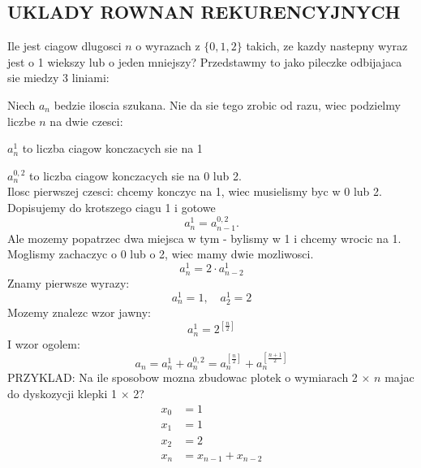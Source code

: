 \documentclass{article}
\begin{document}
\subsection*{UKLADY ROWNAN REKURENCYJNYCH}
    Ile jest ciagow dlugosci $n$ o wyrazach z $\{0,1,2\}$ takich, ze kazdy nastepny wyraz jest o 1 wiekszy lub o jeden mniejszy?
    Przedstawmy to jako \color{acc}pileczke odbijajaca sie miedzy 3 liniami\color{txt}:
    \begin{center}\end{center}
    Niech $a_n$ bedzie iloscia szukana. \color{acc}Nie da sie tego zrobic od razu, wiec podzielmy liczbe $n$ na dwie czesci\color{txt}:\smallskip\par
        $a_n^1$ to liczba ciagow konczacych sie na 1\par
        $a_n^{0,2}$ to liczba ciagow konczacych sie na 0 lub 2.\medskip\\
    Ilosc pierwszej czesci: chcemy konczyc na 1, wiec musielismy byc w 0 lub 2. Dopisujemy do krotszego ciagu 1 i gotowe
    $$a_n^1=a_{n-1}^{0,2}.$$
    Ale mozemy popatrzec dwa miejsca w tym - bylismy w 1 i chcemy wrocic na 1. Moglismy zachaczyc o 0 lub o 2, wiec mamy dwie mozliwosci.
    $$a_n^1=2\cdot a_{n-2}^1$$
    Znamy pierwsze wyrazy:
    $$a_n^1=1,\quad a_2^1=2$$
    Mozemy znalezc wzor jawny:
    $$a_n^1=2^{[\frac{n}2]}$$
    I wzor ogolem:
    $$a_n=a_n^1+a_n^{0,2}=a_n^{[\frac{n}2]}+a_n^{[\frac{n+1}2]}$$
    \color{emp}PRZYKLAD\color{txt}: Na ile sposobow mozna zbudowac plotek o wymiarach 2 $\times$ $n$ majac do dyskozycji klepki 1 $\times$ 2?\\
    \begin{align*}
        x_0&=1\\
        x_1&=1\\
        x_2&=2\\
        x_n&=x_{n-1}+x_{n-2}
    \end{align*}
\end{document}
